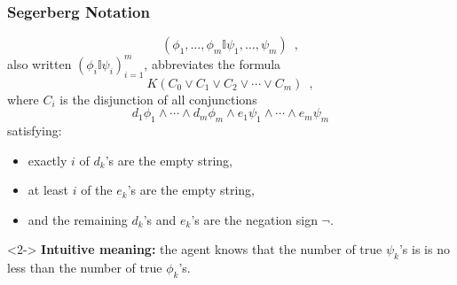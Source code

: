 \begin{frame}
  \frametitle{Segerberg Notation}
  \[
  (\phi_1,\dots,\phi_m\mathbb{I}\psi_1,\dots,\psi_m)\enspace,
  \]
  also written $(\phi_i\mathbb{I}\psi_i)_{i=1}^m$, abbreviates the
  formula
  \[
  K(C_0\lor C_1\lor C_2\lor \cdots\lor C_m)\enspace,
  \]
  where $C_i$ is the disjunction of all conjunctions
  \[
  d_1\phi_1\land\cdots\land d_m\phi_m\land
  e_1\psi_1\land\cdots\land e_m\psi_m
  \]
  satisfying:
  \begin{itemize}
  \item exactly $i$ of $d_k$'s are the empty string, 

  \item at least $i$ of the $e_k$'s are the empty string, 

  \item and the remaining $d_k$'s and $e_k$'s are the negation sign
    $\lnot$.
  \end{itemize}

  \begin{myboxb}<2-> \textbf{Intuitive meaning:} the agent knows that
    the number of true $\psi_k$'s is is no less than the number of
    true $\phi_k$'s.
  \end{myboxb}
\end{frame}

